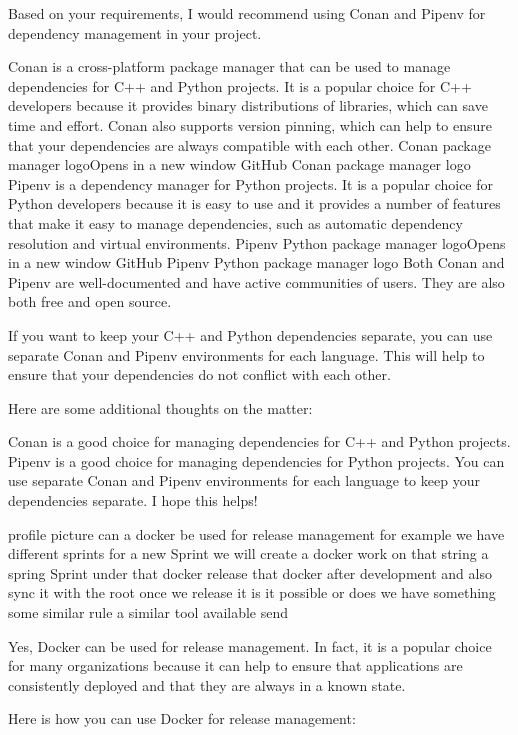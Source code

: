 \documentclass[11pt]{article}
\begin{document}
Based on your requirements, I would recommend using Conan and Pipenv for dependency management in your project.

Conan is a cross-platform package manager that can be used to manage dependencies for C++ and Python projects. It is a popular choice for C++ developers because it provides binary distributions of libraries, which can save time and effort. Conan also supports version pinning, which can help to ensure that your dependencies are always compatible with each other.
Conan package manager logoOpens in a new window
GitHub
Conan package manager logo
Pipenv is a dependency manager for Python projects. It is a popular choice for Python developers because it is easy to use and it provides a number of features that make it easy to manage dependencies, such as automatic dependency resolution and virtual environments.
Pipenv Python package manager logoOpens in a new window
GitHub
Pipenv Python package manager logo
Both Conan and Pipenv are well-documented and have active communities of users. They are also both free and open source.

If you want to keep your C++ and Python dependencies separate, you can use separate Conan and Pipenv environments for each language. This will help to ensure that your dependencies do not conflict with each other.

Here are some additional thoughts on the matter:

Conan is a good choice for managing dependencies for C++ and Python projects.
Pipenv is a good choice for managing dependencies for Python projects.
You can use separate Conan and Pipenv environments for each language to keep your dependencies separate.
I hope this helps!

profile picture
can a docker
be used
for release
management
for example we have different sprints
for a new Sprint
we will
create a docker
work on that string a spring
Sprint
under that docker
release
that docker
after development
and also sync it with the
root
once we release it
is it possible or does we have something some similar rule
a similar tool
available send

Yes, Docker can be used for release management. In fact, it is a popular choice for many organizations because it can help to ensure that applications are consistently deployed and that they are always in a known state.

Here is how you can use Docker for release management:
\end{document}
